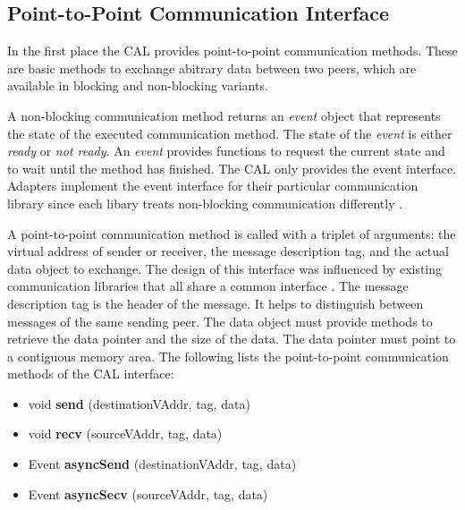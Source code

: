 \subsection{Point-to-Point Communication Interface}
\label{sec:des:p2p}

In the first place the CAL provides point-to-point communication
methods. These are basic methods to exchange abitrary
data between two peers, which are available in blocking and
non-blocking variants.

A non-blocking communication method returns an \emph{event} object that represents
the state of the executed communication method. The state
of the \emph{event} is either \emph{ready} or \emph{not ready}. An
\emph{event} provides functions to request the current state and 
to  wait until the method has finished. The CAL only provides the
event interface. Adapters implement the  event interface for their
particular communication library since each libary treats non-blocking
communication differently \cite{ref:mpi_specification,ref:boost_asio}.

A point-to-point communication method is called with a triplet of
arguments: the virtual address of sender or receiver, the message
description tag, and the actual data object to exchange.  The design
of this interface was influenced by existing communication libraries
that all share a common interface \cite{ref:boost_mpi, ref:boost_asio,
  ref:zmq}. The message description tag is the header of the
message. It helps to distinguish between messages of the same sending
peer.  The data object must provide methods to retrieve the data
pointer and the size of the data. The data pointer must point to a
contiguous memory area. The following lists the point-to-point
communication methods of the CAL interface:

\begin{itemize}

  \item  void \textbf{send }(destinationVAddr, tag, data)
  \item  void \textbf{recv }(sourceVAddr, tag, data)
  \item  Event \textbf{asyncSend }(destinationVAddr, tag, data)
  \item  Event \textbf{asyncSecv }(sourceVAddr, tag, data)

\end{itemize}

